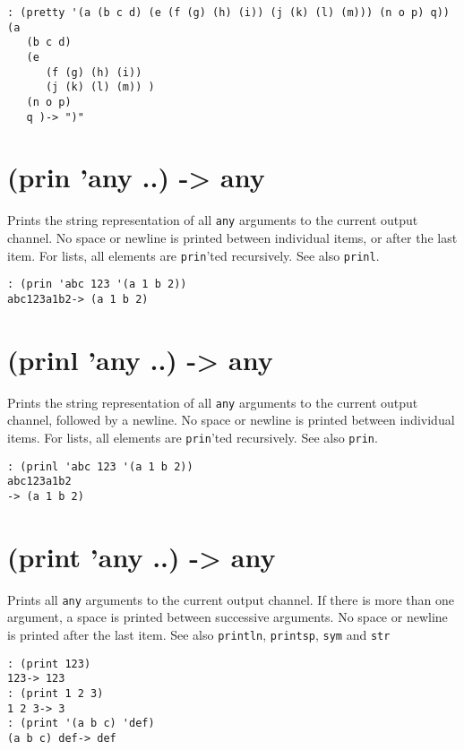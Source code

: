 {{{{{{{\begin{verbatim}
: (pretty '(a (b c d) (e (f (g) (h) (i)) (j (k) (l) (m))) (n o p) q))
(a
   (b c d)
   (e
      (f (g) (h) (i))
      (j (k) (l) (m)) )
   (n o p)
   q )-> ")"
\end{verbatim}

 
\section{(prin 'any ..) -> any}
\label{sec-8-1-16-29}


Prints the string representation of all \texttt{any} arguments to the current
output channel. No space or newline is printed between individual items,
or after the last item. For lists, all elements are \texttt{prin}'ted
recursively. See also \texttt{prinl}.


\begin{verbatim}
: (prin 'abc 123 '(a 1 b 2))
abc123a1b2-> (a 1 b 2)
\end{verbatim}

 
\section{(prinl 'any ..) -> any}
\label{sec-8-1-16-30}


Prints the string representation of all \texttt{any} arguments to the current
output channel, followed by a newline. No space or newline is printed
between individual items. For lists, all elements are \texttt{prin}'ted
recursively. See also \texttt{prin}.


\begin{verbatim}
: (prinl 'abc 123 '(a 1 b 2))
abc123a1b2
-> (a 1 b 2)
\end{verbatim}

 
\section{(print 'any ..) -> any}
\label{sec-8-1-16-31}


Prints all \texttt{any} arguments to the current output channel. If there is
more than one argument, a space is printed between successive arguments.
No space or newline is printed after the last item. See also \texttt{println},
\texttt{printsp}, \texttt{sym} and \texttt{str}


\begin{verbatim}
: (print 123)
123-> 123
: (print 1 2 3)
1 2 3-> 3
: (print '(a b c) 'def)
(a b c) def-> def
\end{verbatim}

}}}}}}}
